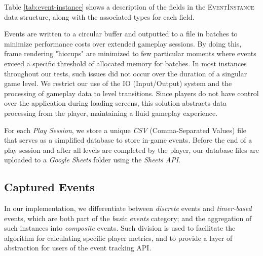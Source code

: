Table \ref{tab:event-instance} shows a description of the fields in the \textsc{EventInstance} data structure, along with the associated types for each field.



Events are written to a circular buffer and outputted to a file in batches to minimize performance costs over extended gameplay sessions. By doing this, frame rendering "hiccups" are minimized to few particular moments where events exceed a specific threshold of allocated memory for batches. In most instances throughout our tests, such issues did not occur over the duration of a singular game level. We restrict our use of the IO (Input/Output) system and the processing of gameplay data to level transitions. Since players do not have control over the application during loading screens, this solution abstracts data processing from the player, maintaining a fluid gameplay experience.


For each \emph{Play Session}, we store a unique \emph{CSV} (Comma-Separated Values) file that serves as a simplified database to store in-game events. Before the end of a play session and after all levels are completed by the player, our database files are uploaded to a \emph{Google Sheets} folder using the \emph{Sheets API}.

\subsection{Captured Events}

In our implementation, we differentiate between \emph{discrete} events and \emph{timer-based} events, which are both part of the \emph{basic events} category; and the aggregation of such instances into \emph{composite} events. Such division is used to facilitate the algorithm for calculating specific player metrics, and to provide a layer of abstraction for users of the event tracking API.


